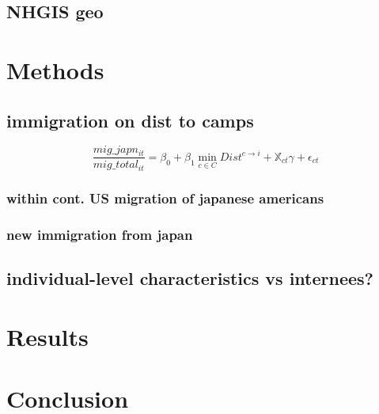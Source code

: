 \documentclass[12pt]{article}
\begin{document}
\subsection{NHGIS geo}\label{nhgis-geo}

\section{Methods}\label{methods}

\subsection{immigration on dist to
camps}\label{immigration-on-dist-to-camps}

\begin{equation}
    \frac{mig\_japn_{it}}{mig\_total_{it}} = \beta_0 + \beta_1 \min_{c\in C} Dist^{c\rightarrow i} 
+ \mathbb{X}_{ct} \gamma +  \epsilon_{ct}
\end{equation}

\subsubsection{within cont. US migration of japanese
americans}\label{within-cont.-us-migration-of-japanese-americans}

\subsubsection{new immigration from
japan}\label{new-immigration-from-japan}

\subsection{individual-level characteristics vs
internees?}\label{individual-level-characteristics-vs-internees}

\section{Results}\label{results}




\section{Conclusion}\label{conclusion}



\end{document}

